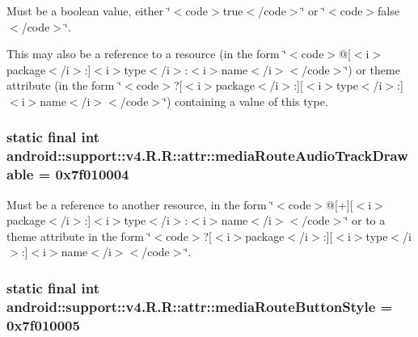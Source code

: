 Must be a boolean value, either \char`\"{}$<$code$>$true$<$/code$>$\char`\"{} or \char`\"{}$<$code$>$false$<$/code$>$\char`\"{}. 

This may also be a reference to a resource (in the form \char`\"{}$<$code$>$@\mbox{[}$<$i$>$package$<$/i$>$:\mbox{]}$<$i$>$type$<$/i$>$:$<$i$>$name$<$/i$>$$<$/code$>$\char`\"{}) or theme attribute (in the form \char`\"{}$<$code$>$?\mbox{[}$<$i$>$package$<$/i$>$:\mbox{]}\mbox{[}$<$i$>$type$<$/i$>$:\mbox{]}$<$i$>$name$<$/i$>$$<$/code$>$\char`\"{}) containing a value of this type. \hypertarget{classandroid_1_1support_1_1v4_1_1_r_1_1attr_e131aa391b4d7f3dc842f3fd5897f700}{
\subsubsection[{mediaRouteAudioTrackDrawable}]{\setlength{\rightskip}{0pt plus 5cm}static final int android::support::v4.R.R::attr::mediaRouteAudioTrackDrawable = 0x7f010004}}
\label{classandroid_1_1support_1_1v4_1_1_r_1_1attr_e131aa391b4d7f3dc842f3fd5897f700}


Must be a reference to another resource, in the form \char`\"{}$<$code$>$@\mbox{[}+\mbox{]}\mbox{[}$<$i$>$package$<$/i$>$:\mbox{]}$<$i$>$type$<$/i$>$:$<$i$>$name$<$/i$>$$<$/code$>$\char`\"{} or to a theme attribute in the form \char`\"{}$<$code$>$?\mbox{[}$<$i$>$package$<$/i$>$:\mbox{]}\mbox{[}$<$i$>$type$<$/i$>$:\mbox{]}$<$i$>$name$<$/i$>$$<$/code$>$\char`\"{}. \hypertarget{classandroid_1_1support_1_1v4_1_1_r_1_1attr_ba7152353d534419c2408c76730e6b48}{
\subsubsection[{mediaRouteButtonStyle}]{\setlength{\rightskip}{0pt plus 5cm}static final int android::support::v4.R.R::attr::mediaRouteButtonStyle = 0x7f010005}}
\label{classandroid_1_1support_1_1v4_1_1_r_1_1attr_ba7152353d534419c2408c76730e6b48}


